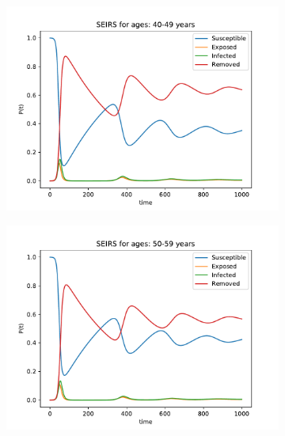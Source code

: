 \begin{figure}[H]
\begin{subfigure}{0.40\textwidth}
\includegraphics[width = \textwidth]{../fig/SEIRS_40-49_n.pdf}
\caption{\protect}
\end{subfigure}
\begin{subfigure}{0.40\textwidth}
\includegraphics[width = \textwidth]{../fig/SEIRS_50-59_n.pdf}
\caption{\protect}
\end{subfigure}
\begin{subfigure}{0.40\textwidth}

\end{subfigure}
\end{figure}
